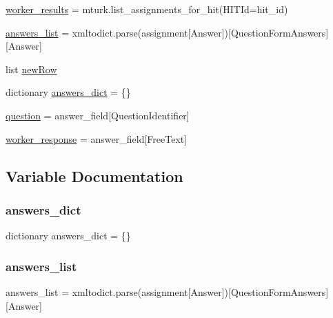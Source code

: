\begin{DoxyCompactItemize}
\mbox{\hyperlink{namespaceget__results_adecf8258a14164dab061b9f9f19f7eea}{worker\+\_\+results}} = mturk.\+list\+\_\+assignments\+\_\+for\+\_\+hit(H\+I\+T\+Id=hit\+\_\+id)
\item 
\mbox{\hyperlink{namespaceget__results_a2a2b7ee9a830d488099c572c9befefa7}{answers\+\_\+list}} = xmltodict.\+parse(assignment\mbox{[}\textquotesingle{}Answer\textquotesingle{}\mbox{]})\mbox{[}\textquotesingle{}Question\+Form\+Answers\textquotesingle{}\mbox{]}\mbox{[}\textquotesingle{}Answer\textquotesingle{}\mbox{]}
\item 
list \mbox{\hyperlink{namespaceget__results_a1f15916248cf6fdeace227e97b91ad44}{new\+Row}}
\item 
dictionary \mbox{\hyperlink{namespaceget__results_ac6397f9fcdf0dbf1cf734e9721b2fcaf}{answers\+\_\+dict}} = \{\}
\item 
\mbox{\hyperlink{namespaceget__results_a1a1b6bd27a93f9139a2f44d01f7b3ad1}{question}} = answer\+\_\+field\mbox{[}\textquotesingle{}Question\+Identifier\textquotesingle{}\mbox{]}
\item 
\mbox{\hyperlink{namespaceget__results_a0c6c25f56511447d8c63f297376435d7}{worker\+\_\+response}} = answer\+\_\+field\mbox{[}\textquotesingle{}Free\+Text\textquotesingle{}\mbox{]}
\end{DoxyCompactItemize}


\subsection{Variable Documentation}
\mbox{\label{namespaceget__results_ac6397f9fcdf0dbf1cf734e9721b2fcaf}} 
\subsubsection{\texorpdfstring{answers\_dict}{answers\_dict}}
{\footnotesize\ttfamily dictionary answers\+\_\+dict = \{\}}

\mbox{\label{namespaceget__results_a2a2b7ee9a830d488099c572c9befefa7}} 
\subsubsection{\texorpdfstring{answers\_list}{answers\_list}}
{\footnotesize\ttfamily answers\+\_\+list = xmltodict.\+parse(assignment\mbox{[}\textquotesingle{}Answer\textquotesingle{}\mbox{]})\mbox{[}\textquotesingle{}Question\+Form\+Answers\textquotesingle{}\mbox{]}\mbox{[}\textquotesingle{}Answer\textquotesingle{}\mbox{]}}

